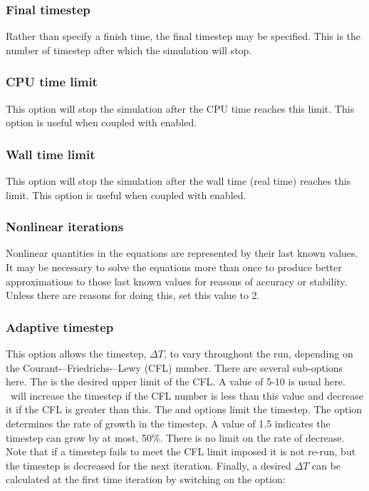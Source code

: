 \subsubsection{Final timestep}

Rather than specify a finish time, the final timestep may be specified. This is the number of timestep after which the simulation will stop.

\subsubsection{CPU time limit}

This option will stop the simulation after the CPU time reaches this limit.
This option is useful when coupled with
 enabled.

\subsubsection{Wall time limit}

This option will stop the simulation after the wall time (real time) reaches
this limit. This option is useful when coupled with
 enabled.

\subsubsection{Nonlinear iterations}
Nonlinear quantities in the equations are represented by their last known
values. It may be necessary to solve the equations more than once to produce
better approximations to those last known values for reasons of accuracy or
stability. Unless there are reasons for doing this, set this value to 2.

\subsubsection{Adaptive timestep}
\label{section:config_adaptive_timestep}
This option allows the timestep, $\Delta T$, to vary throughout the run, depending on the 
Courant-–Friedrichs-–Lewy (CFL) number.  There are several sub-options here. The
 is the desired upper limit of the CFL. A value of 5-10 is usual
here. \fluidity\ will increase the timestep if the CFL number is less than this value and decrease
it if the CFL is greater than this. The  and 
 options limit the timestep. The option 
 determines
the rate of growth in the timestep. A value of 1.5 indicates the timestep can grow by
at most, 50\%. There is no limit on the rate of decrease. Note that if a timestep fails
to meet the CFL limit imposed it is not re-run, but the timestep is decreased for the next
iteration. Finally, a desired $\Delta T$ can be calculated at the first time iteration by
switching on the option: 

